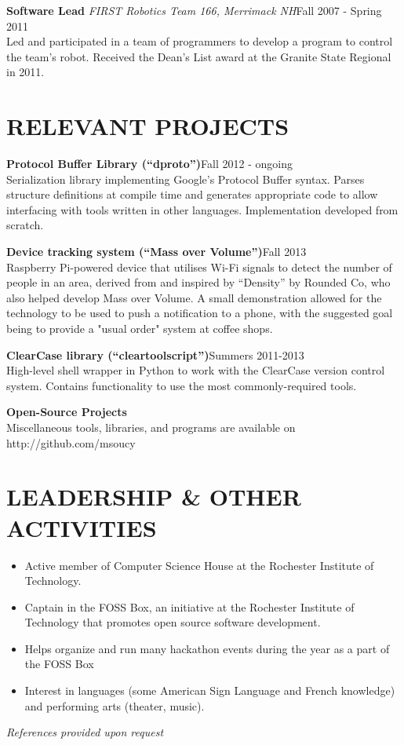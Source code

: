 \documentclass[line]{res}
\newcommand{\project}[2]{{\bf #1}\hfill #2\\}
\newcommand{\job}[3]{{\bf #1} {\it #2}\hfill #3\\}
\begin{document}
\begin{resume}
	\job{Software Lead}{FIRST Robotics Team 166, Merrimack NH}{Fall 2007 - Spring 2011}
	Led and participated in a team of programmers to develop a program to control the team's robot.
	Received the Dean's List award at the Granite State Regional in 2011.

\section{RELEVANT PROJECTS}

	\project{Protocol Buffer Library (``dproto'')}{Fall 2012 - ongoing}
	Serialization library implementing Google's Protocol Buffer syntax.
	Parses structure definitions at compile time and generates appropriate code to allow interfacing with tools written in other languages.
	Implementation developed from scratch.

	\project{Device tracking system (``Mass over Volume'')}{Fall 2013}
	Raspberry Pi-powered device that utilises Wi-Fi signals to detect the number of people in an area, derived from and inspired by ``Density'' by Rounded Co, who also helped develop Mass over Volume.
	A small demonstration allowed for the technology to be used to push a notification to a phone, with the suggested goal being to provide a "usual order" system at coffee shops.

	\project{ClearCase library (``cleartoolscript'')}{Summers 2011-2013}
	High-level shell wrapper in Python to work with the ClearCase version control system. Contains functionality to use the most commonly-required tools.

	\project{Open-Source Projects}{}
	Miscellaneous tools, libraries, and programs are available on http://github.com/msoucy

\section{LEADERSHIP \& OTHER ACTIVITIES}
	\begin{itemize}[leftmargin=10pt]
	\item Active member of Computer Science House at the Rochester Institute of Technology.
	\item Captain in the FOSS Box, an initiative at the Rochester Institute of Technology that promotes open source software development.
	\item Helps organize and run many hackathon events during the year as a part of the FOSS Box
	\item Interest in languages (some American Sign Language and French knowledge) and performing arts (theater, music).
	\end{itemize}

\begin{center}
\vspace{-0.26in}
\emph{References provided upon request\\[8pt]}
\end{center}

\end{resume}
\end{document}
